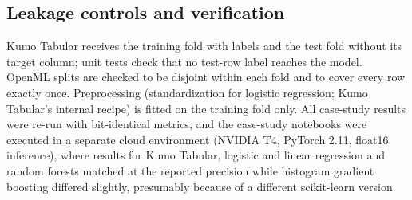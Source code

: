 \subsection{Leakage controls and verification}
Kumo Tabular receives the training fold with labels and the test fold without its target column; unit tests check that
no test-row label reaches the model. OpenML splits are checked to be disjoint within each fold and to cover every row
exactly once. Preprocessing (standardization for logistic regression; Kumo Tabular's internal recipe) is fitted on the
training fold only. All case-study results were re-run with bit-identical metrics, and the case-study notebooks
\citep{anonymous2026supplement} were executed in a separate cloud environment (NVIDIA T4, PyTorch 2.11, float16 inference), where results for Kumo Tabular,
logistic and linear regression and random forests matched at the reported precision while histogram gradient boosting
differed slightly, presumably because of a different scikit-learn version.
